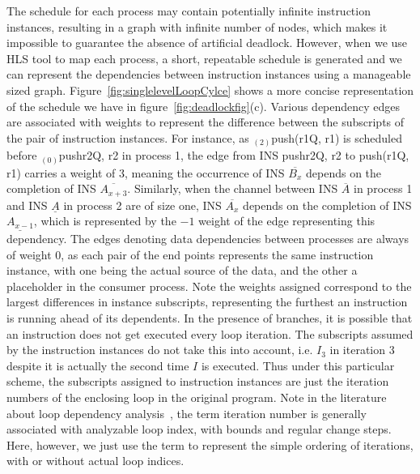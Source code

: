 The schedule for each process may contain potentially infinite instruction instances, resulting in a graph with infinite number of nodes,
which makes it impossible to guarantee the absence of artificial deadlock.
However, when we use HLS tool to map each process,
a short, repeatable schedule is generated and we can represent the
dependencies between instruction instances using a manageable
sized graph. 
Figure~\ref{fig:singlelevelLoopCylce} shows a more concise
representation of the schedule we have in figure~\ref{fig:deadlockfig}(c).
Various dependency edges are associated with weights to 
represent the difference between the subscripts of the pair of instruction
instances. For instance, as $_{(2)}$push(r1Q, r1) is 
scheduled before $_{(0)}$push{r2Q, r2} in process 1, the edge from INS push{r2Q, r2} %
to 
push(r1Q, r1)
carries
a weight of 3, meaning the occurrence of INS $\overline{B_x}$ depends on the completion of INS $\overline{A_{x+3}}$. Similarly, when the channel between 
INS $\overline{A}$ in process 1 and INS $\underline{A}$ in process 2 are of size one, INS $\overline{A_x}$ depends on the completion of INS $\underline{A_{x-1}}$, 
which is represented by the $-1$ weight of the edge representing this
dependency. The edges denoting data dependencies between processes
are always of weight 0, as each pair of the end points represents the same instruction instance, with one being the actual source of the data, and the other a placeholder in the consumer process.
Note the weights assigned correspond to the largest differences
in instance subscripts, representing the furthest an instruction is running
ahead of its dependents. In the presence of branches, it is possible that
an instruction does not get executed every loop iteration. The subscripts
assumed by the instruction instances do not take this into account, i.e. $I_3$
in iteration 3 despite it is actually the second time $I$ is executed. Thus under
this particular scheme, the subscripts assigned to instruction instances
are just the iteration numbers of the enclosing loop in the original program.
Note in the literature about loop dependency analysis~\cite{Kennedy:2001:OCM:502981}, the term iteration number is generally associated with analyzable loop index, with
bounds and regular change steps. Here, however, we just use the term to represent the simple ordering of iterations, with or without actual loop indices.

